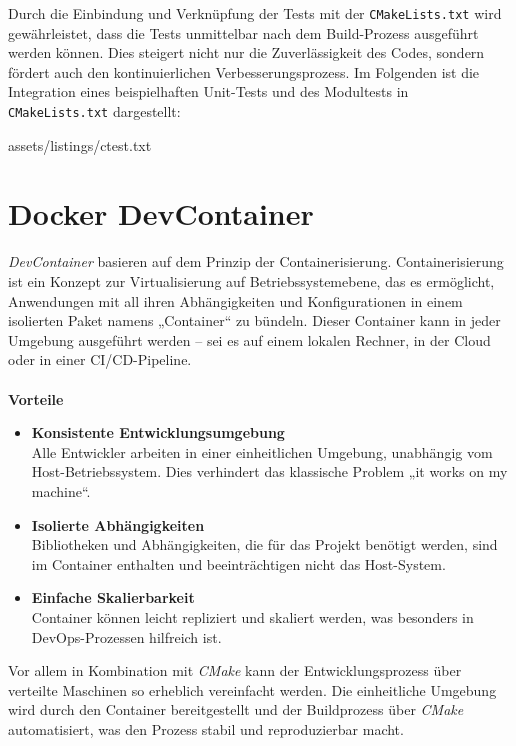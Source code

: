 Durch die Einbindung und Verknüpfung der Tests mit der \texttt{CMakeLists.txt} wird gewährleistet, dass die Tests unmittelbar nach dem Build-Prozess ausgeführt werden können.
Dies steigert nicht nur die Zuverlässigkeit des Codes, sondern fördert auch den kontinuierlichen Verbesserungsprozess.
Im Folgenden ist die Integration eines beispielhaften Unit-Tests und des Modultests in \texttt{CMakeLists.txt} dargestellt:

{assets/listings/ctest.txt}

\section{Docker DevContainer}
\label{sec:tooling-docker}
\textit{DevContainer} basieren auf dem Prinzip der Containerisierung.
Containerisierung ist ein Konzept zur Virtualisierung auf Betriebssystemebene, das es ermöglicht, Anwendungen mit all ihren Abhängigkeiten und Konfigurationen in einem isolierten Paket namens „Container“ zu bündeln.
Dieser Container kann in jeder Umgebung ausgeführt werden – sei es auf einem lokalen Rechner, in der Cloud oder in einer CI/CD-Pipeline. \cite{Docker2024}\\\\
\textbf{Vorteile}
\begin{itemize}
    \item \textbf{Konsistente Entwicklungsumgebung}\\
    Alle Entwickler arbeiten in einer einheitlichen Umgebung, unabhängig vom Host-Betriebssystem.
    Dies verhindert das klassische Problem „it works on my machine“.
    \item \textbf{Isolierte Abhängigkeiten}\\
    Bibliotheken und Abhängigkeiten, die für das Projekt benötigt werden, sind im Container enthalten und beeinträchtigen nicht das Host-System.
    \item \textbf{Einfache Skalierbarkeit}\\
    Container können leicht repliziert und skaliert werden, was besonders in DevOps-Prozessen hilfreich ist.
\end{itemize}
Vor allem in Kombination mit \textit{CMake} kann der Entwicklungsprozess über verteilte Maschinen so erheblich vereinfacht werden.
Die einheitliche Umgebung wird durch den Container bereitgestellt und der Buildprozess über \textit{CMake} automatisiert, was den Prozess stabil und reproduzierbar macht.
\newpage
